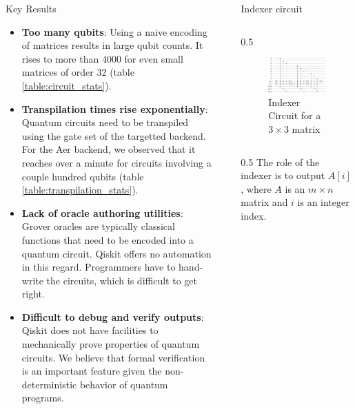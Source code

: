 \documentclass[final]{beamer}
\newlength{\sepwidth}
\newlength{\colwidth}
\newcommand{\separatorcolumn}{\begin{column}{\sepwidth}\end{column}}
\begin{document}
\begin{frame}[t]
\begin{columns}[t]
\begin{column}{\colwidth}
  \begin{alertblock}{Key Results}
    \begin{itemize}
      \item \textbf{Too many qubits}: Using a naive encoding of matrices results
        in large qubit counts. It rises to more than 4000 for even small
        matrices of order 32 (table \ref{table:circuit_stats}).
      \item \textbf{Transpilation times rise exponentially}: Quantum circuits
        need to be transpiled using the gate set of the targetted backend. For
        the Aer backend, we observed that it reaches over a minute for circuits
        involving a couple hundred qubits (table
        \ref{table:transpilation_stats}).
      \item \textbf{Lack of oracle authoring utilities}: Grover oracles are typically classical functions that need to be encoded into a quantum circuit. Qiskit offers no automation in this regard. Programmers have to hand-write the circuits, which is difficult to get right.
      \item \textbf{Difficult to debug and verify outputs}: Qiskit does not have
        facilities to mechanically prove properties of quantum circuits. We
        believe that formal verification is an important feature given the
        non-deterministic behavior of quantum programs.
    \end{itemize}
  \end{alertblock}
\end{column}

\separatorcolumn

\begin{column}{\colwidth}
  \begin{block}{Indexer circuit}
    \begin{column}{0.5\colwidth}
    \begin{figure}
      \centering
      \includegraphics[scale=0.5]{../paper/results/indexer_3x3.png} 
      \caption{Indexer Circuit for a $3 \times 3$ matrix}
      \label{fig:indexer_circuit_3x3}
    \end{figure}
    \end{column}
    \begin{column}{0.5\colwidth}
      \vfill
      The role of the indexer is to output $A[i]$, where $A$ is an $m \times n$
      matrix and $i$ is an integer index. 


\end{column}
\end{block}
\end{column}
\end{columns}
\end{frame}
\end{document}
